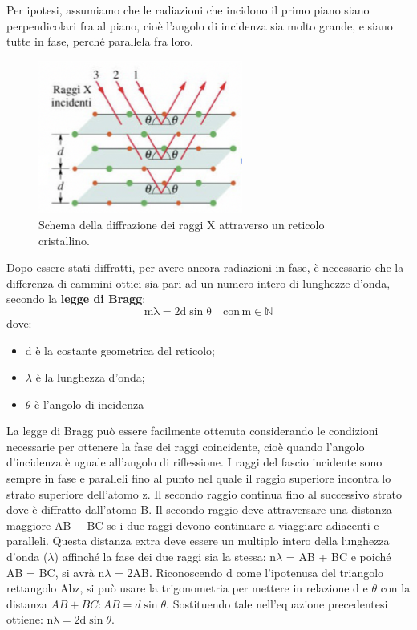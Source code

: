 Per ipotesi, assumiamo che le radiazioni che incidono il primo piano siano perpendicolari fra al piano, cioè l’angolo di incidenza sia molto grande, e siano tutte in fase, perché parallela fra loro.
\begin{figure}[hb]
    \includegraphics[width=0.6\textwidth]{images/img10.png}
    \caption{Schema della diffrazione dei raggi X attraverso un reticolo cristallino.}
\end{figure}

Dopo essere stati diffratti, per avere ancora radiazioni in fase, è necessario che la differenza di cammini ottici sia pari ad un numero intero di lunghezze d'onda, secondo la \textbf{legge di Bragg}:
\begin{equation*}
    \mathrm{m\lambda = 2d\sin{\theta}\quad con\, m\in\mathbb{N}}
\end{equation*} 
dove:\begin{itemize}
    \item d è la costante geometrica del reticolo;
    \item $\lambda$ è la lunghezza d'onda;
    \item $\theta$ è l'angolo di incidenza
\end{itemize}
La legge di Bragg può essere facilmente ottenuta considerando le condizioni necessarie per ottenere la fase dei raggi coincidente, cioè quando l'angolo d'incidenza è uguale all'angolo di riflessione. I raggi del fascio incidente sono sempre in fase e paralleli fino al punto nel quale il raggio superiore incontra lo strato superiore dell'atomo z. Il secondo raggio continua fino al successivo strato dove è diffratto dall'atomo B. Il secondo raggio deve attraversare una distanza maggiore AB + BC se i due raggi devono continuare a viaggiare adiacenti e paralleli.
Questa distanza extra deve essere un multiplo intero della lunghezza d'onda ($\lambda$) affinché la fase dei due raggi sia la stessa: n$\lambda$ = AB + BC e poiché AB = BC, si avrà n$\lambda$ = 2AB. Riconoscendo d come l'ipotenusa del triangolo rettangolo Abz, si può usare la trigonometria per mettere in relazione d e $\theta$ con la distanza $AB+BC: AB = d \sin\theta$. Sostituendo tale nell'equazione precedentesi ottiene: $\mathrm{n\lambda = 2 d} \sin{\theta}$.

